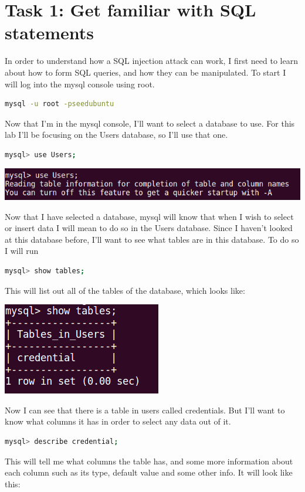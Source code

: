 \documentclass[14pt]{extarticle}
\begin{document}
\section{Task 1: Get familiar with SQL statements}
In order to understand how a SQL injection attack can work, I first need to learn about how to form SQL queries, and how they can be manipulated. To start I will log into the mysql console using root.
\begin{lstlisting}[language=sh]
mysql -u root -pseedubuntu
\end{lstlisting}
Now that I'm in the mysql console, I'll want to select a database to use. For this lab I'll be focusing on the Users database, so I'll use that one.
\begin{lstlisting}[language=sh]
mysql> use Users;
\end{lstlisting}
\begin{center}
\includegraphics[width=.8\linewidth]{use-users}\\
\end{center}
Now that I have selected a database, mysql will know that when I wish to select or insert data I will mean to do so in the Users database. Since I haven't looked at this database before, I'll want to see what tables are in this database. To do so I will run
\begin{lstlisting}[language=sh]
mysql> show tables;
\end{lstlisting}
This will list out all of the tables of the database\cite{seed-sqlatk}, which looks like:\\
\begin{center}
\includegraphics[width=0.3\linewidth]{show-tables}\\
\end{center}
Now I can see that there is a table in users called credentials. But I'll want to know what columns it has in order to select any data out of it.
\begin{lstlisting}[language=sh]
mysql> describe credential;
\end{lstlisting}
This will tell me what columns the table has, and some more information about each column such as its type, default value and some other info. It will look like this:\\
\end{document}
